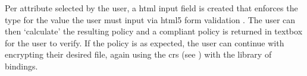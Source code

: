 Per attribute selected by the user, a \acrshort{html} input field is created that enforces the type for the value the user must input via \acrshort{html}5 form validation \citep{Foundation2019}. The user can then `calculate' the resulting policy and a \PyOpenABE compliant policy is returned in textbox for the user to verify. If the policy is as expected, the user can continue with encrypting their desired file, again using the \acrshort{crs} (see ) with the \PyOpenABE library of bindings.
